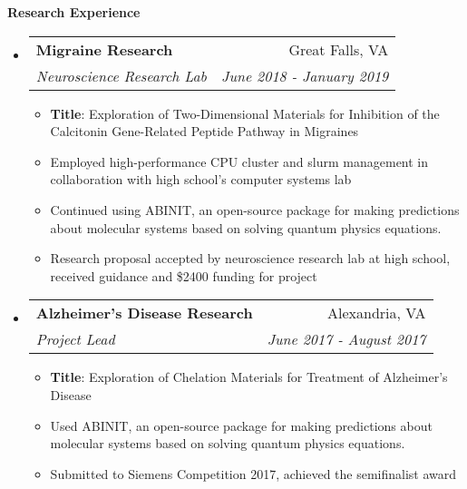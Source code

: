 \documentclass[letterpaper,10pt]{article}
\makeatletter
\newcommand{\resitem}[1]{\item #1 \vspace{-3.5pt}}
\newcommand{\resheading}[1]{{\large \colorbox{mygrey}{\begin{minipage}{\textwidth}{\textbf{#1 \vphantom{p\^{E}}}}\end{minipage}}}}
\newcommand{\ressubheading}[4]{
\begin{tabular*}{7.0in}{l@{\extracolsep{\fill}}r}
		\textbf{#1} & #2 \\
		\textit{#3} & \textit{#4} \\
\end{tabular*}\vspace{-6pt}}
\makeatother
\begin{document}
\resheading{Research Experience}
\begin{itemize}
\item
	\ressubheading{Migraine Research}{Great Falls, VA}{Neuroscience Research Lab}{June 2018 - January 2019}
	\begin{itemize}
		\resitem{\textbf{Title}: Exploration of Two-Dimensional Materials for Inhibition of the Calcitonin Gene-Related Peptide Pathway in Migraines}
	    \resitem{Employed high-performance CPU cluster and slurm management in collaboration with high school's computer systems lab}
	    \resitem{Continued using ABINIT, an open-source package for making predictions about molecular systems based on solving quantum physics equations.}
	    \resitem{Research proposal accepted by neuroscience research lab at high school, received guidance and \$2400 funding for project}
	\end{itemize}
\item
	\ressubheading{Alzheimer's Disease Research}{Alexandria, VA}{Project Lead}{June 2017 - August 2017}
	\begin{itemize}
	    \resitem{\textbf{Title}: Exploration of Chelation Materials for Treatment of Alzheimer's Disease}
		\resitem{Used ABINIT, an open-source package for making predictions about molecular systems based on solving quantum physics equations.}
		\resitem{Submitted to Siemens Competition 2017, achieved the semifinalist award}

\end{itemize}
\end{itemize}
\end{document}
